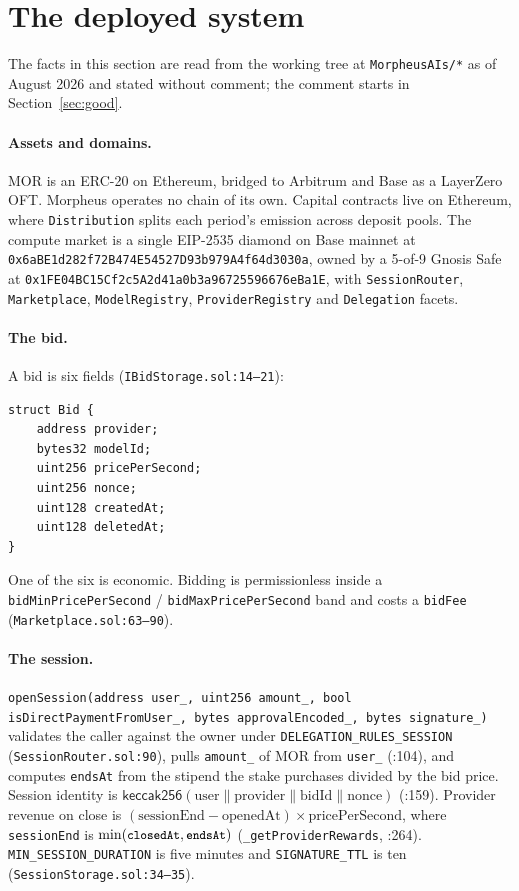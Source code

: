 \documentclass[11pt,a4paper]{article}
\newcommand{\code}[1]{\texttt{\small #1}}
\begin{document}
\section{The deployed system}

The facts in this section are read from the working tree at
\code{MorpheusAIs/*} as of August 2026 and stated without comment; the comment
starts in Section~\ref{sec:good}.

\paragraph{Assets and domains.} MOR is an ERC-20 on Ethereum, bridged to
Arbitrum and Base as a LayerZero OFT. Morpheus operates no chain of its own.
Capital contracts live on Ethereum, where \code{Distribution} splits each
period's emission across deposit pools. The compute market is a single EIP-2535
diamond on Base mainnet at
\code{0x6aBE1d282f72B474E54527D93b979A4f64d3030a}, owned by a 5-of-9 Gnosis Safe
at \code{0x1FE04BC15Cf2c5A2d41a0b3a96725596676eBa1E}, with \code{SessionRouter},
\code{Marketplace}, \code{ModelRegistry}, \code{ProviderRegistry} and
\code{Delegation} facets.

\paragraph{The bid.} A bid is six fields
(\code{IBidStorage.sol:14--21}):

\begin{lstlisting}[language=Solidity]
struct Bid {
    address provider;
    bytes32 modelId;
    uint256 pricePerSecond;
    uint256 nonce;
    uint128 createdAt;
    uint128 deletedAt;
}
\end{lstlisting}

\noindent
One of the six is economic. Bidding is permissionless inside a
\code{bidMinPricePerSecond} / \code{bidMaxPricePerSecond} band and costs a
\code{bidFee} (\code{Marketplace.sol:63--90}).

\paragraph{The session.} \code{openSession(address user\_, uint256 amount\_,
bool isDirectPaymentFromUser\_, bytes approvalEncoded\_, bytes signature\_)}
validates the caller against the owner under
\code{DELEGATION\_RULES\_SESSION} (\code{SessionRouter.sol:90}), pulls
\code{amount\_} of MOR from \code{user\_} (:104), and computes
\code{endsAt} from the stipend the stake purchases divided by the bid price.
Session identity is
$\mathsf{keccak256}(\text{user} \| \text{provider} \| \text{bidId} \|
\text{nonce})$ (:159). Provider revenue on close is
$(\text{sessionEnd} - \text{openedAt}) \times \text{pricePerSecond}$, where
\code{sessionEnd} is $\min(\code{closedAt},\code{endsAt})$
(\code{\_getProviderRewards}, :264). \code{MIN\_SESSION\_DURATION} is five
minutes and \code{SIGNATURE\_TTL} is ten (\code{SessionStorage.sol:34--35}).
\end{document}
